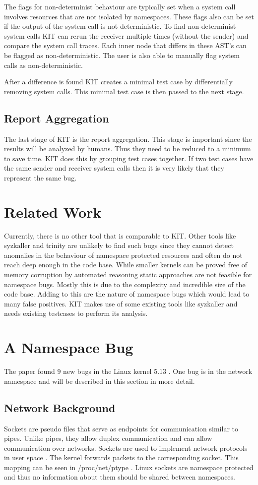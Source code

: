 \documentclass[10pt,twocolumn,a4paper]{article}
\begin{document}
The flags for non-determinist behaviour are typically set when a system call involves resources that are not isolated by namespaces.
These flags also can be set if the output of the system call is not deterministic. 
To find non-determinist system calls KIT can rerun the receiver multiple times (without the sender) and compare the system call traces.
Each inner node that differs in these AST's can be flagged as non-deterministic.
The user is also able to manually flag system calls as non-deterministic\cite{0}.

After a difference is found KIT creates a minimal test case by differentially removing system calls.
This minimal test case is then passed to the next stage\cite{0}.
\subsection{Report Aggregation}
The last stage of KIT is the report aggregation. This stage is important since the results will be
analyzed by humans.
Thus they need to be reduced to a minimum to save time.
KIT does this by grouping test cases together.
If two test cases have the same sender and receiver system calls then it is very likely that they represent the same bug\cite{0}. 

\section{Related Work}
Currently, there is no other tool that is comparable to  KIT. Other tools like syzkaller\cite{4} and trinity\cite{5} are
unlikely to find such bugs since they cannot detect anomalies in the behaviour of
namespace protected resources and often do not reach deep enough in the code base.
While smaller kernels can be proved free of memory corruption by automated reasoning static approaches are not feasible for namespace bugs.\cite{30} 
Mostly this is due to the complexity and incredible size of the code base. Adding to this are the nature of namespace bugs 
which would lead to many false positives.
KIT makes use of some existing tools like syzkaller and needs existing testcases to
perform its analysis\cite{0}\cite{2}.
\section{A Namespace Bug}\label{sec:bug}
The paper found 9 new bugs in the Linux kernel 5.13 \cite{0}. One bug is in the network namespace
and will be described in this section in more detail. 
\subsection{Network Background}
Sockets are pseudo files that serve as endpoints for communication similar to pipes. Unlike pipes,
they allow duplex communication and can allow communication over networks\cite{5}. Sockets are
used to implement network protocols in user space \cite{5}. The kernel forwards packets to the
corresponding socket. This mapping can be seen in /proc/net/ptype \cite{6}. Linux sockets are
namespace protected and thus no information about them should be shared between namespaces.
\end{document}
